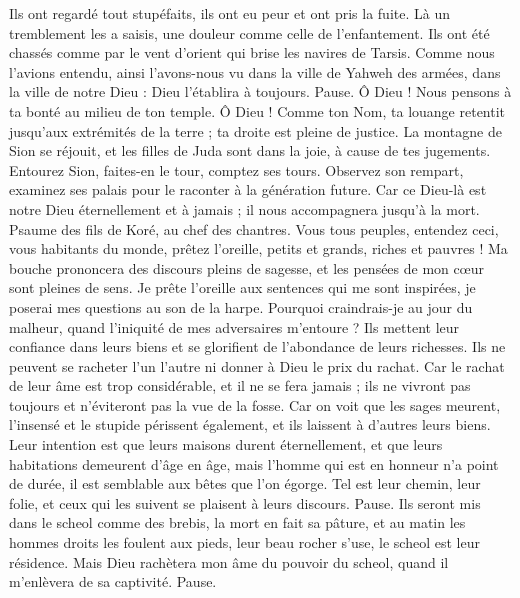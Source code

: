 \begin{multicols}{2}
Ils ont regardé tout stupéfaits, ils ont eu peur et ont pris la fuite.
Là un tremblement les a saisis, une douleur comme celle de l’enfantement.
Ils ont été chassés comme par le vent d'orient qui brise les navires de Tarsis.
Comme nous l'avions entendu, ainsi l'avons-nous vu dans la ville de Yahweh des armées, dans la ville de notre Dieu : Dieu l’établira à toujours. Pause.
Ô Dieu ! Nous pensons à ta bonté au milieu de ton temple.
Ô Dieu ! Comme ton Nom, ta louange retentit jusqu'aux extrémités de la terre ; ta droite est pleine de justice.
La montagne de Sion se réjouit, et les filles de Juda sont dans la joie, à cause de tes jugements.
Entourez Sion, faites-en le tour, comptez ses tours.
Observez son rempart, examinez ses palais pour le raconter à la génération future.
Car ce Dieu-là est notre Dieu éternellement et à jamais ; il nous accompagnera jusqu’à la mort.
\VerseOne{}Psaume des fils de Koré, au chef des chantres.
Vous tous peuples, entendez ceci, vous habitants du monde, prêtez l'oreille,
petits et grands, riches et pauvres !
Ma bouche prononcera des discours pleins de sagesse, et les pensées de mon cœur sont pleines de sens.
Je prête l'oreille aux sentences qui me sont inspirées, je poserai mes questions au son de la harpe.
Pourquoi craindrais-je au jour du malheur, quand l'iniquité de mes adversaires m'entoure ?
Ils mettent leur confiance dans leurs biens et se glorifient de l'abondance de leurs richesses.
Ils ne peuvent se racheter l’un l’autre ni donner à Dieu le prix du rachat.
Car le rachat de leur âme est trop considérable, et il ne se fera jamais ;
ils ne vivront pas toujours et n’éviteront pas la vue de la fosse.
Car on voit que les sages meurent, l’insensé et le stupide périssent également, et ils laissent à d’autres leurs biens.
Leur intention est que leurs maisons durent éternellement, et que leurs habitations demeurent d'âge en âge,
mais l'homme qui est en honneur n’a point de durée, il est semblable aux bêtes que l’on égorge.
Tel est leur chemin, leur folie, et ceux qui les suivent se plaisent à leurs discours. Pause.
Ils seront mis dans le scheol comme des brebis, la mort en fait sa pâture, et au matin les hommes droits les foulent aux pieds, leur beau rocher s’use, le scheol est leur résidence.
Mais Dieu rachètera mon âme du pouvoir du scheol, quand il m’enlèvera de sa captivité. Pause.

\end{multicols}
